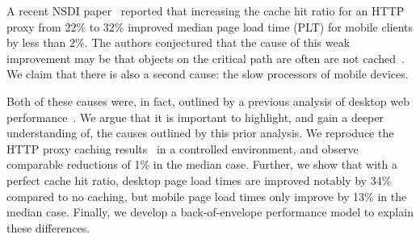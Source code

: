 A recent NSDI paper~\cite{flywheel} reported that
increasing the cache hit ratio for an HTTP proxy from 22\% to 32\% improved
median page load time (PLT) for mobile clients by less than 2\%.
The authors conjectured that the cause of this weak improvement may be that objects on the
critical path are often are not cached~\cite{flywheel_slides}.
We claim that there is also a second cause: the slow processors of mobile devices.

Both of
these causes were, in fact, outlined by a previous analysis of desktop
web performance~\cite{wang2013demystifying}. We argue that it is
important to highlight, and gain a deeper understanding of, the causes outlined by this prior
analysis. We reproduce the HTTP proxy caching
results~\cite{flywheel} in a controlled
environment, and observe comparable reductions of 1\% in the median
case. Further, we show that
with a perfect cache hit ratio, desktop page load times are
improved notably by 34\% compared to no caching, but mobile page
load times only improve by 13\% in the median case. Finally, we develop a
back-of-envelope performance model to explain these differences.




